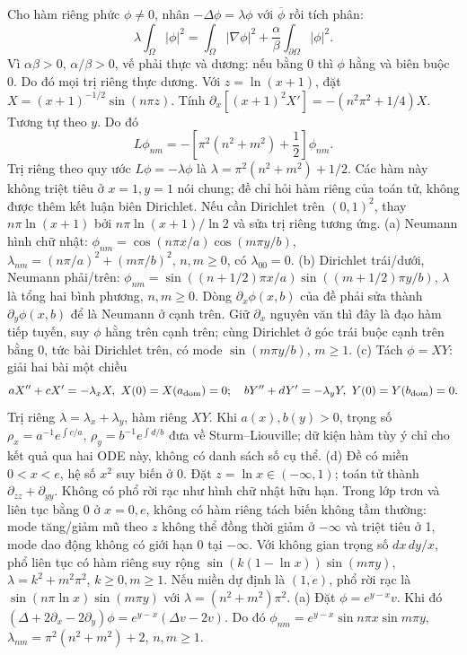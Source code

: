 Cho hàm riêng phức $\phi\ne0$, nhân $-\Delta\phi=\lambda\phi$ với $\overline\phi$ rồi tích phân:
\[\lambda\int_\Omega|\phi|^2=\int_\Omega|\nabla\phi|^2+\frac\alpha\beta\int_{\partial\Omega}|\phi|^2.\]
Vì $\alpha\beta>0$, $\alpha/\beta>0$, vế phải thực và dương: nếu bằng 0 thì $\phi$ hằng và biên buộc 0. Do đó mọi trị riêng thực dương.
Với $z=\ln(x+1)$, đặt $X=(x+1)^{-1/2}\sin(n\pi z)$. Tính $\partial_x[(x+1)^2X']=-(n^2\pi^2+1/4)X$. Tương tự theo $y$. Do đó
\[L\phi_{nm}=-\left[\pi^2(n^2+m^2)+\frac12\right]\phi_{nm}.\]
Trị riêng theo quy ước $L\phi=-\lambda\phi$ là $\lambda=\pi^2(n^2+m^2)+1/2$. Các hàm này không triệt tiêu ở $x=1,y=1$ nói chung; đề chỉ hỏi hàm riêng của toán tử, không được thêm kết luận biên Dirichlet. Nếu cần Dirichlet trên $(0,1)^2$, thay $n\pi\ln(x+1)$ bởi $n\pi\ln(x+1)/\ln2$ và sửa trị riêng tương ứng.
(a) Neumann hình chữ nhật: $\phi_{nm}=\cos(n\pi x/a)\cos(m\pi y/b)$, $\lambda_{nm}=(n\pi/a)^2+(m\pi/b)^2$, $n,m\ge0$, có $\lambda_{00}=0$.
(b) Dirichlet trái/dưới, Neumann phải/trên: $\phi_{nm}=\sin((n+1/2)\pi x/a)\sin((m+1/2)\pi y/b)$, $\lambda$ là tổng hai bình phương, $n,m\ge0$. Dòng $\partial_x\phi(x,b)$ của đề phải sửa thành $\partial_y\phi(x,b)$ để là Neumann ở cạnh trên. Giữ $\partial_x$ nguyên văn thì đây là đạo hàm tiếp tuyến, suy $\phi$ hằng trên cạnh trên; cùng Dirichlet ở góc trái buộc cạnh trên bằng 0, tức bài Dirichlet trên, có mode $\sin(m\pi y/b)$, $m\ge1$.
(c) Tách $\phi=XY$: giải hai bài một chiều
\[aX''+cX'=-\lambda_xX,\ X(0)=X(a_{\rm dom})=0;\quad bY''+dY'=-\lambda_yY,\ Y(0)=Y(b_{\rm dom})=0.\]
Trị riêng $\lambda=\lambda_x+\lambda_y$, hàm riêng $XY$. Khi $a(x),b(y)>0$, trọng số $\rho_x=a^{-1}e^{\int c/a}$, $\rho_y=b^{-1}e^{\int d/b}$ đưa về Sturm--Liouville; dữ kiện hàm tùy ý chỉ cho kết quả qua hai ODE này, không có danh sách số cụ thể.
(d) Đề có miền $0<x<e$, hệ số $x^2$ suy biến ở 0. Đặt $z=\ln x\in(-\infty,1)$; toán tử thành $\partial_{zz}+\partial_{yy}$. Không có phổ rời rạc như hình chữ nhật hữu hạn. Trong lớp trơn và liên tục bằng 0 ở $x=0,e$, không có hàm riêng tách biến không tầm thường: mode tăng/giảm mũ theo $z$ không thể đồng thời giảm ở $-\infty$ và triệt tiêu ở 1, mode dao động không có giới hạn 0 tại $-\infty$. Với không gian trọng số $dx\,dy/x$, phổ liên tục có hàm riêng suy rộng $\sin(k(1-\ln x))\sin(m\pi y)$, $\lambda=k^2+m^2\pi^2$, $k\ge0,m\ge1$. Nếu miền dự định là $(1,e)$, phổ rời rạc là $\sin(n\pi\ln x)\sin(m\pi y)$ với $\lambda=(n^2+m^2)\pi^2$.
(a) Đặt $\phi=e^{y-x}v$. Khi đó $(\Delta+2\partial_x-2\partial_y)\phi=e^{y-x}(\Delta v-2v)$. Do đó $\phi_{nm}=e^{y-x}\sin n\pi x\sin m\pi y$, $\lambda_{nm}=\pi^2(n^2+m^2)+2$, $n,m\ge1$.
